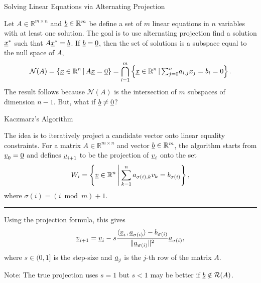 \documentclass[10pt,letterpaper,english]{beamer}
\begin{document}
\begin{frame}{Solving Linear Equations via Alternating Projection}

Let $A\in\mathbb{R}^{m\times n}$ and $\underline b\in\mathbb{R}^{m}$ be define a set of $m$ linear equations in $n$ variables with at least one solution. The goal is to use alternating projection find a solution $\underline x^{*}$ such that $A\underline x^{*}=\underline b$. If $\underline b=\underline 0$, then the set of solutions is a subspace equal to the null space of $A$,
\[
\mathcal{N}(A)=\left\{ \underline x\in\mathbb{R}^{n}\,|\,A\underline x=\underline 0\right\} =\bigcap_{i=1}^{m}\left\{ \underline x\in\mathbb{R}^{n}\,|\,{\textstyle \sum_{j=0}^{n}}a_{i,j}x_{j}=b_i = 0\right\} .
\]
The result follows because $\mathcal{N}(A)$ is the intersection of $m$ subspaces of dimension $n-1$. But, what if $\underline b\neq\underline 0$?

\end{frame}

\begin{frame}{Kaczmarz's Algorithm}

The idea is to iteratively project a candidate vector onto linear equality constraints. For a matrix $A\in\mathbb{R}^{m\times n}$ and vector $\underline b\in\mathbb{R}^{m}$, the algorithm starts from $\underline{v}_0 = \underline{0}$ and defines $\underline v_{i+1}$ to be the projection of $\underline v_{i}$ onto the set \vspace{-0.5mm}
\[
W_{i}=\left\{ \underline v\in\mathbb{R}^{n}\,\middle|\:\sum_{k=1}^{n}a_{\sigma(i),k}v_{k}=b_{\sigma(i)}\right\} ,
\]
where $\sigma(i)=(i\bmod m)+1$.
\vspace{3mm}

\hrule

\vspace{3mm}

Using the projection formula, this gives  \vspace{-0.5mm}
\begin{equation*}
\underline v_{i+1}=\underline v_{i}- s \frac{{\langle \underline v_{i} \mskip1mu , \underline a_{\sigma(i)} \rangle}-b_{\sigma(i)}}{\text{\ensuremath{\|}}\underline a_{\sigma(i)}\|^{2}}\underline a_{\sigma(i)},
\end{equation*}
where $s\in(0,1]$ is the step-size and $\underline a_{j}$ is the $j$-th row of the matrix $A$. 

\vspace{5mm}
Note: The true projection uses $s=1$ but $s<1$ may be better if $\underline{b} \notin \mathcal{R}(A)$. 
\end{frame}
\end{document}
